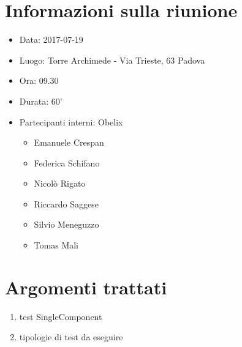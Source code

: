 \documentclass[10 pt,a4paper, openany]{article}
\date{}
\begin{document}
\paginatitolo
\section{Informazioni sulla riunione}

\begin{itemize}
\item[] Data: 2017-07-19
\item[] Luogo: Torre Archimede - Via Trieste, 63 Padova
\item[] Ora: 09.30
\item[] Durata: 60'
\item[] Partecipanti interni: Obelix
  \begin{itemize}
  \item[] Emanuele Crespan
  \item[] Federica Schifano
  \item[] Nicolò Rigato
  \item[] Riccardo Saggese
  \item[] Silvio Meneguzzo
  \item[] Tomas Mali
 \end{itemize}
\end{itemize}

\section{Argomenti trattati}
\begin{enumerate}
	\item test SingleComponent 	
	\item tipologie di test da eseguire 

	
\end{enumerate}
\end{document}
